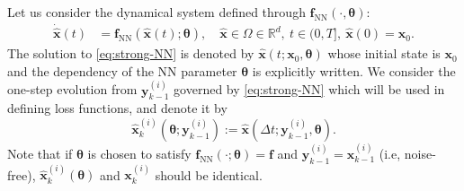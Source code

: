 \documentclass[final]{siamltex}
\newcommand{\bfa}[1]{\boldsymbol{#1}}
\begin{document}
Let us consider the dynamical system defined through $\bfa{f}_{\text{NN}}(\cdot,\bfa{\theta})$:
\begin{equation}
\label{eq:strong-NN}
\begin{split}
\dot{\widehat{\bfa{x}}}(t) &= \bfa{f}_\text{NN}(\widehat{\bfa{x}}(t);\bfa{\theta}), \quad \widehat{\bfa{x}} \in \Omega \in \mathbb{R}^d, \ t \in (0,T], \ 
\widehat{\bfa{x}}(0) = \bfa{x}_0.
\end{split}
\end{equation}
The solution to \eqref{eq:strong-NN} is denoted by $\widehat{\bfa{x}}(t;\bfa{x}_0,\bfa{\theta})$ whose initial state is $\bfa{x}_0$ and the dependency of the NN parameter $\bfa{\theta}$ is explicitly written.
We consider the one-step evolution from $\bfa{y}_{k-1}^{(i)}$ governed by \eqref{eq:strong-NN} which will be used in defining loss functions, and denote it by 
\begin{equation} \label{def:one-step-NNprediction}
    \widehat{\bfa{x}}_k^{(i)}(\bfa{\theta};\bfa{y}^{(i)}_{k-1}) := \widehat{\bfa{x}}(\Delta t;\bfa{y}_{k-1}^{(i)},\bfa{\theta}).
\end{equation}
Note that if $\bfa{\theta}$ is chosen to satisfy $\bfa{f}_\text{NN}(\cdot;\bfa{\theta}) = \bfa{f}$ and $\bfa{y}_{k-1}^{(i)} = \bfa{x}_{k-1}^{(i)}$ (i.e, noise-free), $\widehat{\bfa{x}}_k^{(i)}(\bfa{\theta})$ and $\bfa{x}_k^{(i)}$ should be identical.
\end{document}
